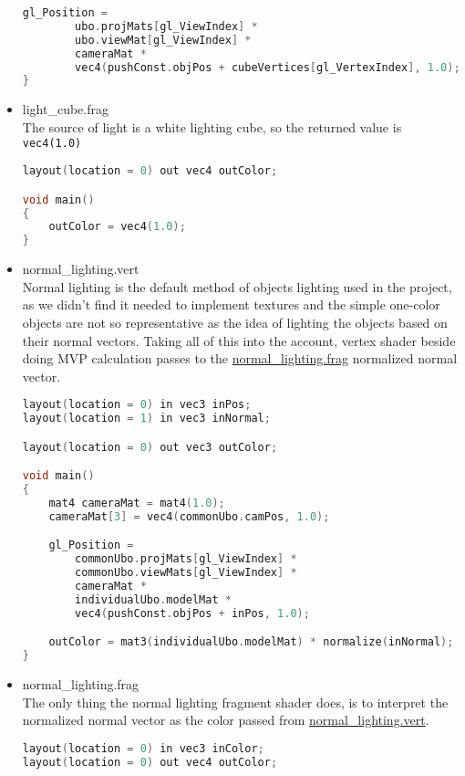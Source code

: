 \begin{itemize}
\begin{lstlisting}[language=c++, caption=Light cube vertex shader(./assets/shaders/light\_cube.vert)]
    gl_Position =
        ubo.projMats[gl_ViewIndex] *
        ubo.viewMat[gl_ViewIndex] *
        cameraMat *
        vec4(pushConst.objPos + cubeVertices[gl_VertexIndex], 1.0);
}
\end{lstlisting}
    \item light\_cube.frag\\
    The source of light is a white lighting cube, so the returned value is \texttt{vec4(1.0)}
\begin{lstlisting}[language=c++, caption=Light cube fragment shader(./assets/shaders/light\_cube.frag)]
layout(location = 0) out vec4 outColor;

void main()
{
    outColor = vec4(1.0);
}
\end{lstlisting}
    \item normal\_lighting.vert\\
    \label{vert_normal_light}
    Normal lighting is the default method of objects lighting used in the project, as we didn't find it needed to implement textures and the simple one-color objects are not so representative as the idea of lighting the objects based on their normal vectors. Taking all of this into the account, vertex shader beside doing MVP calculation passes to the \hyperref[frag_normal_light]{normal\_lighting.frag} normalized normal vector.
\begin{lstlisting}[language=c++, caption=Normal lighting vertex shader(./assets/shaders/normal\_lighting.vert)]
layout(location = 0) in vec3 inPos;
layout(location = 1) in vec3 inNormal;

layout(location = 0) out vec3 outColor;

void main()
{
    mat4 cameraMat = mat4(1.0);
    cameraMat[3] = vec4(commonUbo.camPos, 1.0);

    gl_Position =
        commonUbo.projMats[gl_ViewIndex] *
        commonUbo.viewMats[gl_ViewIndex] *
        cameraMat *
        individualUbo.modelMat *
        vec4(pushConst.objPos + inPos, 1.0);

    outColor = mat3(individualUbo.modelMat) * normalize(inNormal);
}
\end{lstlisting}
    \item normal\_lighting.frag\\
    The only thing the normal lighting fragment shader does, is to interpret the normalized normal vector as the color passed from \hyperref[vert_normal_light]{normal\_lighting.vert}.
    \label{frag_normal_light}
\begin{lstlisting}[language=c++, caption=Normal lighting fragment shader(./assets/shaders/normal\_lighting.frag)]
layout(location = 0) in vec3 inColor;
layout(location = 0) out vec4 outColor;


\end{lstlisting}
\end{itemize}
